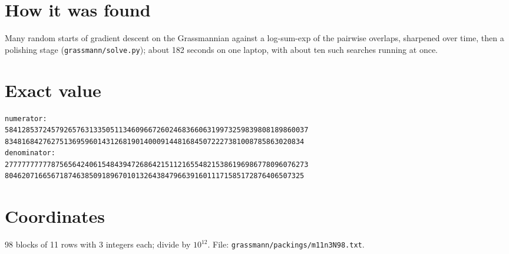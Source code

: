\documentclass[11pt,a4paper]{article}
\begin{document}
\section{How it was found}
Many random starts of gradient descent on the Grassmannian against a log-sum-exp of the pairwise overlaps, sharpened over time, then a polishing stage (\texttt{grassmann/solve.py}); about 182 seconds on one laptop, with about ten such searches running at once.


\appendix
\section{Exact value}
{\small
\begin{verbatim}
numerator:
584128537245792657631335051134609667260246836606319973259839808189860037
83481684276275136959601431268190140009144816845072227381008785863020834
denominator:
277777777778756564240615484394726864215112165548215386196986778096076273
80462071665671874638509189670101326438479663916011171585172876406507325
\end{verbatim}}

\section{Coordinates}
98 blocks of 11 rows with 3 integers each; divide by $10^{12}$. File: \texttt{grassmann/packings/m11n3N98.txt}.
{\tiny
\begin{multicols}{3}
\end{multicols}}
\end{document}
